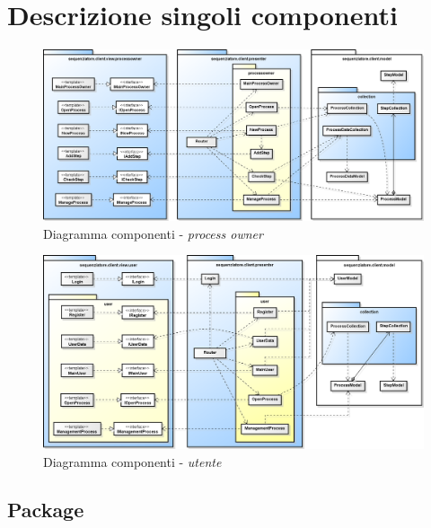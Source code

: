 \section{Descrizione singoli componenti}

\begin{figure}[H] \centering \includegraphics[width=%
\textwidth]
{./pack/POPackage.png} \caption{Diagramma componenti - \textit{process owner}}
\end{figure}

\begin{figure}[H] \centering \includegraphics[width=%
\textwidth]
{./pack/UserMainPackage.png} \caption{Diagramma componenti - \textit{utente}}
\end{figure}


\subsection{Package \view{}}

